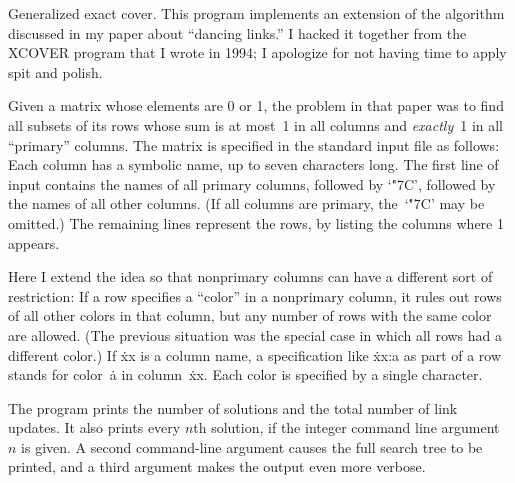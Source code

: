 
\srcloctrue
\datethis

Generalized exact cover.
This program implements an extension of
the algorithm discussed in my paper about ``dancing
links.'' I hacked it together from the {\mc XCOVER} program that I wrote in
1994; I apologize for not having time to apply spit and polish.

Given a matrix whose elements are 0 or 1, the problem in that paper was to
find all subsets of its rows whose sum is at most~1 in all columns and
{\it exactly\/}~1 in all ``primary'' columns. The matrix is specified
in the standard input file as follows: Each column has a symbolic name,
up to seven characters long. The first line of input contains
the names of all primary columns, followed by `\.{\char"7C}', followed by
the names of all other columns.
(If all columns are primary, the~`\.{\char"7C}' may be omitted.)
The remaining lines represent the rows, by listing the columns where 1 appears.

Here I extend the idea so that nonprimary columns can have a different sort
of restriction: If a row specifies a ``color'' in a nonprimary column,
it rules out rows of all other colors in that column,
but any number of rows with the
same color are allowed. (The previous situation was the special case
in which all rows had a different color.)
If \.{xx} is a column name, a specification like \.{xx:a} as part of a row
stands for color~\.a in column~\.{xx}. Each color is specified by a
single character.

The program prints the number of solutions and the total number of link
updates. It also prints every $n$th solution, if the integer command
line argument $n$ is given. A second command-line argument causes the
full search tree to be printed, and a third argument makes the output
even more verbose.

